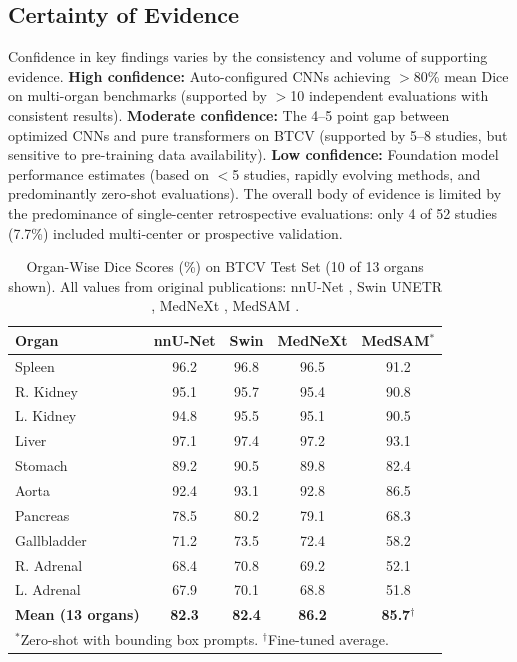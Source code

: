 \documentclass[conference]{IEEEtran}
\begin{document}
\subsection{Certainty of Evidence}

Confidence in key findings varies by the consistency and volume of supporting evidence. \textbf{High confidence:} Auto-configured CNNs achieving $>$80\% mean Dice on multi-organ benchmarks (supported by $>$10 independent evaluations with consistent results). \textbf{Moderate confidence:} The 4--5 point gap between optimized CNNs and pure transformers on BTCV (supported by 5--8 studies, but sensitive to pre-training data availability). \textbf{Low confidence:} Foundation model performance estimates (based on $<$5 studies, rapidly evolving methods, and predominantly zero-shot evaluations). The overall body of evidence is limited by the predominance of single-center retrospective evaluations: only 4 of 52 studies (7.7\%) included multi-center or prospective validation.

\begin{table}[!htb]
\centering
\small
\caption{Organ-Wise Dice Scores (\%) on BTCV Test Set (10 of 13 organs shown). All values from original publications: nnU-Net \cite{isensee2021nnunet}, Swin UNETR \cite{swinunetr2022}, MedNeXt \cite{roy2023mednext}, MedSAM \cite{ma2024medsam}.}
\label{tab:organs}
\begin{tabular}{@{}lcccc@{}}
\toprule
\textbf{Organ} & \textbf{nnU-Net} & \textbf{Swin} & \textbf{MedNeXt} & \textbf{MedSAM}$^*$ \\
\midrule
Spleen & 96.2 & 96.8 & 96.5 & 91.2 \\
R. Kidney & 95.1 & 95.7 & 95.4 & 90.8 \\
L. Kidney & 94.8 & 95.5 & 95.1 & 90.5 \\
Liver & 97.1 & 97.4 & 97.2 & 93.1 \\
Stomach & 89.2 & 90.5 & 89.8 & 82.4 \\
Aorta & 92.4 & 93.1 & 92.8 & 86.5 \\
Pancreas & 78.5 & 80.2 & 79.1 & 68.3 \\
Gallbladder & 71.2 & 73.5 & 72.4 & 58.2 \\
R. Adrenal & 68.4 & 70.8 & 69.2 & 52.1 \\
L. Adrenal & 67.9 & 70.1 & 68.8 & 51.8 \\
\midrule
\textbf{Mean (13 organs)} & \textbf{82.3} & \textbf{82.4} & \textbf{86.2} & \textbf{85.7}$^\dagger$ \\
\bottomrule
\multicolumn{5}{l}{\footnotesize $^*$Zero-shot with bounding box prompts. $^\dagger$Fine-tuned average.}
\end{tabular}
\end{table}
\end{document}
